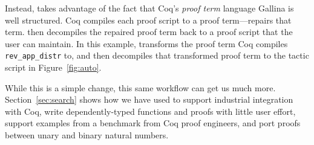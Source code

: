 Instead, \toolname takes advantage of the fact that Coq's \textit{proof term} language Gallina is well structured.
Coq compiles each proof script to a proof term---\toolname repairs that term.
\toolname then decompiles the repaired proof term back to a proof script that the user can maintain.
In this example, \toolname transforms the proof term Coq compiles \lstinline{rev_app_distr} to,
and then decompiles that transformed proof term to the tactic script in Figure~\ref{fig:auto}.

While this is a simple change, this same workflow can get us much more.
Section~\ref{sec:search} shows how we have used \toolname to support industrial integration with Coq,
write dependently-typed functions and proofs with little user effort,
support examples from a benchmark from Coq proof engineers,
and port proofs between unary and binary natural numbers.




